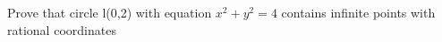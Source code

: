 Prove that circle l(0,2) with equation $x^2+y^2=4$ contains infinite points with rational coordinates